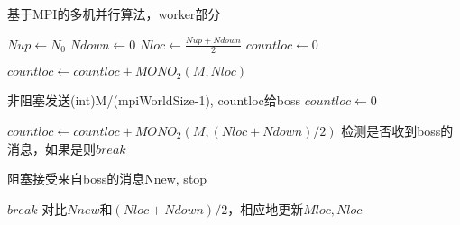 \begin{algorithm}
  \caption{基于MPI的多机并行算法，worker部分}
  \label{alg:mpi}
  \begin{algorithmic}[1]
    \Else 
    \State $Nup \gets N_0$
    \State $Ndown \gets 0$
    \State $Nloc \gets \frac{Nup+Ndown}{2}$
    \State $countloc \gets 0$
    
    \State $countloc \gets countloc + MONO_2(M, Nloc)$
    \EndFor 
    
    \State 非阻塞发送(int)M/(mpiWorldSize-1), countloc给boss
    \State $countloc \gets 0$
    
    \State $countloc \gets countloc + MONO_2(M, (Nloc+Ndown)/2)$
    \State 检测是否收到boss的消息，如果是则$break$
    \EndIf
    \EndFor
    
    \State 阻塞接受来自boss的消息Nnew, stop
    
    \State $break$
    \Else
    \State $对比Nnew和(Nloc+Ndown)/2，相应地更新Mloc, Nloc$
    \EndIf

    \EndWhile
    \EndIf
    \EndProcedure
	\end{algorithmic}
\end{algorithm}

